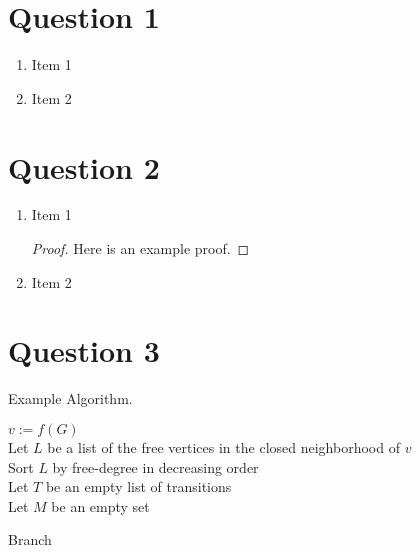 \documentclass[12pt,letterpaper]{article}
\begin{document}
\section*{Question 1}

\begin{enumerate}[label=(\alph*)]
  \item Item 1
  \item Item 2
\end{enumerate}

\section*{Question 2}

\begin{enumerate}[label=(\arabic*)]
  \item Item 1
  \begin{proof}
    Here is an example proof.
  \end{proof}

  \item Item 2
\end{enumerate}

\section*{Question 3}

\begin{exa}Example Algorithm.\end{exa}

\begin{algorithm}[H]
  \BlankLine
  $v := f(G)$\\

  \BlankLine
  Let $L$ be a list of the free vertices in the closed neighborhood of $v$\\
  Sort $L$ by free-degree in decreasing order\\
  Let $T$ be an empty list of transitions\\
  Let $M$ be an empty set\\

  \BlankLine

  \caption{Branch}
\end{algorithm}
\end{document}
